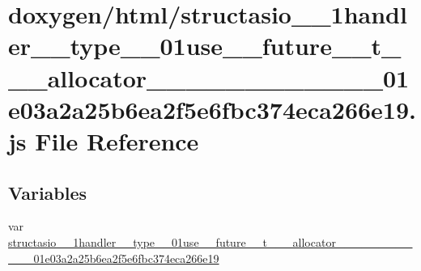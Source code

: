 \hypertarget{structasio__1__1handler____type__3__01use____future____t__3__01__allocator__01__4__00__01__01__01db3d95d9d27069a8236572896dd48f5}{}\section{doxygen/html/structasio\+\_\+\_\+1handler\+\_\+\+\_\+type\+\_\+\_\+01use\+\_\+\+\_\+future\+\_\+\+\_\+t\+\_\+\_\+\_\+allocator\+\_\+\_\+\_\+\_\+\_\+\_\+\_\+\_\+\_\+\_\+\_\+\_\+01e03a2a25b6ea2f5e6fbc374eca266e19.js File Reference}
\label{structasio__1__1handler____type__3__01use____future____t__3__01__allocator__01__4__00__01__01__01db3d95d9d27069a8236572896dd48f5}
\subsection*{Variables}
\begin{DoxyCompactItemize}
\item 
var \hyperlink{structasio__1__1handler____type__3__01use____future____t__3__01__allocator__01__4__00__01__01__01db3d95d9d27069a8236572896dd48f5_a625ce58a869e16660ca231c0ad423edd}{structasio\+\_\+\_\+1handler\+\_\+\+\_\+type\+\_\+\_\+01use\+\_\+\+\_\+future\+\_\+\+\_\+t\+\_\+\_\+\_\+allocator\+\_\+\_\+\_\+\_\+\_\+\_\+\_\+\_\+\_\+\_\+\_\+\_\+01e03a2a25b6ea2f5e6fbc374eca266e19}
\end{DoxyCompactItemize}


